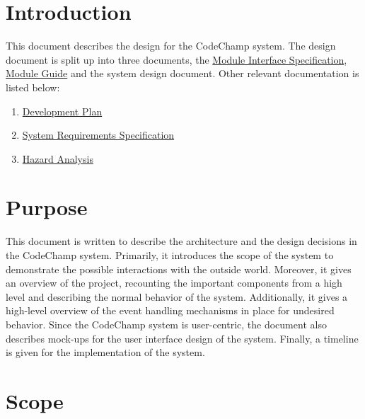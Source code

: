 \documentclass[12pt, titlepage]{article}
\begin{document}
\section{Introduction}
This document describes the design for the CodeChamp system. The design document is split up into three documents, the \href{https://github.com/Tamas-Leung/CodeChamp/tree/main/docs/Design/MIS}{Module Interface Specification}, \href{https://github.com/Tamas-Leung/CodeChamp/tree/main/docs/Design/MG}{Module Guide} and the system design document. Other relevant documentation is listed below:
\begin{enumerate}
    \item \href{https://github.com/Tamas-Leung/CodeChamp/tree/main/docs/DevelopmentPlan}{Development Plan}
    \item \href{https://github.com/Tamas-Leung/CodeChamp/tree/main/docs/SRS}{System Requirements Specification} 
    \item \href{https://github.com/Tamas-Leung/CodeChamp/blob/main/docs/HazardAnalysis/HazardAnalysis.md}{Hazard Analysis} 
    
\end{enumerate}

\section{Purpose}

This document is written to describe the architecture and the design decisions in the CodeChamp system. Primarily, it introduces the scope of the system to demonstrate the possible interactions with the outside world. Moreover, it gives an overview of the project, recounting the important components from a high level and describing the normal behavior of the system. Additionally, it gives a high-level overview of the event handling mechanisms in place for undesired behavior. Since the CodeChamp system is user-centric, the document also describes mock-ups for the user interface design of the system. Finally, a timeline is given for the implementation of the system. 


\section{Scope}
\end{document}
